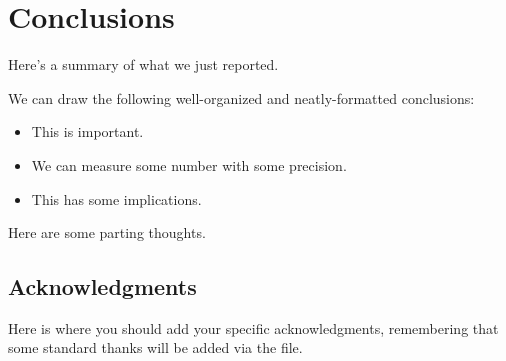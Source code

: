 \documentclass[\docopts]{\docclass}
\begin{document}

\section{Conclusions}
\label{sec:conclusions}

Here's a summary of what we just reported.

We can draw the following well-organized and neatly-formatted conclusions:
\begin{itemize}
  \item This is important.
  \item We can measure some number with some precision.
  \item This has some implications.
\end{itemize}

Here are some parting thoughts.



\subsection*{Acknowledgments}

Here is where you should add your specific acknowledgments, remembering that some standard thanks will be added via the  file.





\end{document}
